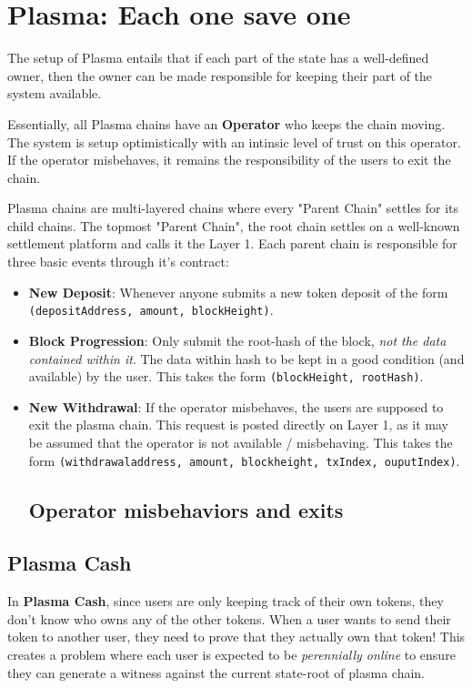 \section{Plasma: Each one save one}
The setup of Plasma entails that if each part of the state has a well-defined owner, then the owner can be made responsible for keeping their part of the system available.

Essentially, all Plasma chains have an \textbf{Operator} who keeps the chain moving. The system is setup optimistically with an intinsic level of trust on this operator. If the operator misbehaves, it remains the responsibility of the users to exit the chain.

Plasma chains are multi-layered chains where every "Parent Chain" settles for its child chains. The topmost "Parent Chain", the root chain settles on a well-known settlement platform and calls it the Layer 1. Each parent chain is responsible for three basic events through it's contract:
\begin{itemize}
    \item \textbf{New Deposit}: Whenever anyone submits a new token deposit of the form \texttt{(depositAddress, amount, blockHeight)}.
    \item \textbf{Block Progression}: Only submit the root-hash of the block, \emph{not the data contained within it}. The data within hash to be kept in a good condition (and available) by the user. This takes the form \texttt{(blockHeight, rootHash)}.
    \item \textbf{New Withdrawal}: If the operator misbehaves, the users are supposed to exit the plasma chain. This request is posted directly on Layer 1, as it may be assumed that the operator is not available / misbehaving. This takes the form \texttt{(withdrawaladdress, amount, blockheight, txIndex, ouputIndex)}.

\subsection{Operator misbehaviors and exits}
\end{itemize} 

\subsection{Plasma Cash}
In \textbf{Plasma Cash}, since users are only keeping track of their own tokens, they don't know who owns any of the other tokens. When a user wants to send their token to another user, they need to prove that they actually own that token! This creates a problem where each user is expected to be \emph{perennially online} to ensure they can generate a witness against the current state-root of plasma chain.

